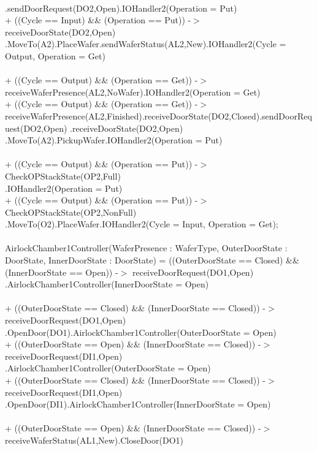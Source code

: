 \documentclass[a4paper,12pt]{article}
\begin{document}
	\\.sendDoorRequest(DO2,Open).IOHandler2(Operation = Put)
	\\+ ((Cycle == Input) \&\& (Operation == Put)) -$>$ receiveDoorState(DO2,Open)
	\\.MoveTo(A2).PlaceWafer.sendWaferStatus(AL2,New).IOHandler2(Cycle = Output, Operation = Get)
	\\
	\\+ ((Cycle == Output) \&\& (Operation == Get)) -$>$ receiveWaferPresence(AL2,NoWafer).IOHandler2(Operation = Get)
	\\+ ((Cycle == Output) \&\& (Operation == Get)) -$>$ receiveWaferPresence(AL2,Finished).receiveDoorState(DO2,Closed).sendDoorRequest(DO2,Open)
	.receiveDoorState(DO2,Open)
	\\.MoveTo(A2).PickupWafer.IOHandler2(Operation = Put)
	\\
	\\+ ((Cycle == Output) \&\& (Operation == Put)) -$>$ CheckOPStackState(OP2,Full)
	\\.IOHandler2(Operation = Put)
	\\+ ((Cycle == Output) \&\& (Operation == Put)) -$>$ CheckOPStackState(OP2,NonFull)
	\\.MoveTo(O2).PlaceWafer.IOHandler2(Cycle = Input, Operation = Get);
	\\
	\\AirlockChamber1Controller(WaferPresence : WaferType, OuterDoorState : DoorState, InnerDoorState : DoorState) =
	((OuterDoorState == Closed) \&\& (InnerDoorState == Open)) -$>$ receiveDoorRequest(DO1,Open)
	\\.AirlockChamber1Controller(InnerDoorState = Open)
	\\
	\\+ ((OuterDoorState == Closed) \&\& (InnerDoorState == Closed)) -$>$ receiveDoorRequest(DO1,Open)
	\\.OpenDoor(DO1).AirlockChamber1Controller(OuterDoorState = Open)
	\\+ ((OuterDoorState == Open) \&\& (InnerDoorState == Closed)) -$>$ receiveDoorRequest(DI1,Open)
	\\.AirlockChamber1Controller(OuterDoorState = Open)
	\\+ ((OuterDoorState == Closed) \&\& (InnerDoorState == Closed)) -$>$ receiveDoorRequest(DI1,Open)
	\\.OpenDoor(DI1).AirlockChamber1Controller(InnerDoorState = Open)
	\\
	\\+ ((OuterDoorState == Open) \&\& (InnerDoorState == Closed)) -$>$ receiveWaferStatus(AL1,New).CloseDoor(DO1)
\end{document}
